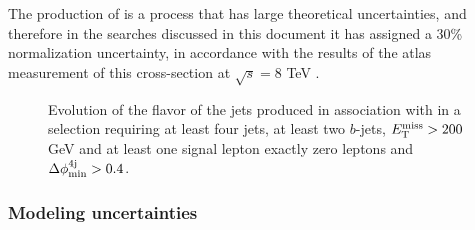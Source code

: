 The production of \tthf is a process that has large theoretical uncertainties, and therefore in the searches discussed in this document 
it has assigned a 30\% normalization uncertainty, in accordance with the results of the \gls{atlas} measurement of this cross-section 
at $\sqrt{s}= 8$ TeV \cite{TOPQ-2014-10}.

\begin{figure}[htb]
\centering 
{}
\caption{Evolution of the flavor of the jets produced in association with \ttbar in a selection requiring at least four jets, at least two $b$-jets, $E_{\rm T}^{\mathrm{miss}}>200$ GeV and  at least one signal lepton  exactly zero leptons and $\Delta\phi_{\rm{min}}^{4{\rm{j}}} > 0.4$.}\label{fig:ttbar_HF_bjets}
\end{figure}


\subsubsection*{Modeling uncertainties}

